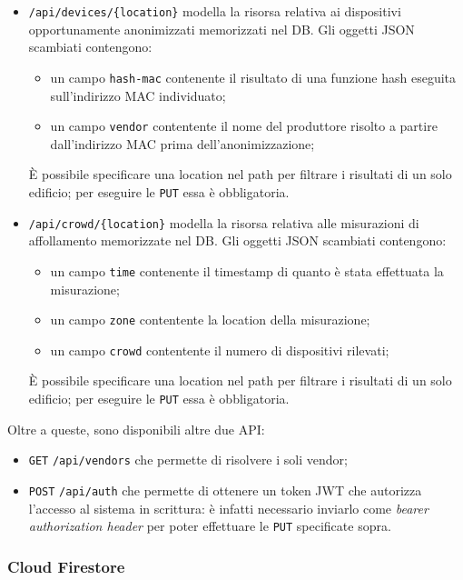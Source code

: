 \begin{itemize}
  \item
    \texttt{/api/devices/\{location\}} modella la risorsa relativa ai dispositivi opportunamente anonimizzati memorizzati nel DB\@.
    Gli oggetti JSON scambiati contengono:
    \begin{itemize}
      \item un campo \texttt{hash-mac} contenente il risultato di una funzione hash eseguita sull'indirizzo MAC individuato;
      \item un campo \texttt{vendor} contentente il nome del produttore risolto a partire dall'indirizzo MAC prima dell'anonimizzazione;
    \end{itemize}
    È possibile specificare una location nel path per filtrare i risultati di un solo edificio; per eseguire le \texttt{PUT} essa è obbligatoria.
  \item
    \texttt{/api/crowd/\{location\}} modella la risorsa relativa alle misurazioni di affollamento memorizzate nel DB\@.
    Gli oggetti JSON scambiati contengono:
    \begin{itemize}
      \item un campo \texttt{time} contenente il timestamp di quanto è stata effettuata la misurazione;
      \item un campo \texttt{zone} contentente la location della misurazione;
      \item un campo \texttt{crowd} contentente il numero di dispositivi rilevati;
    \end{itemize}
    È possibile specificare una location nel path per filtrare i risultati di un solo edificio; per eseguire le \texttt{PUT} essa è obbligatoria.
\end{itemize}

Oltre a queste, sono disponibili altre due API\@:

\begin{itemize}
  \item \texttt{GET} \texttt{/api/vendors} che permette di risolvere i soli vendor;
  \item
    \texttt{POST} \texttt{/api/auth} che permette di ottenere un token JWT che autorizza l'accesso al sistema in scrittura:
    è infatti necessario inviarlo come \emph{bearer authorization header} per poter effettuare le \texttt{PUT} specificate sopra.
\end{itemize}

\subsubsection{Cloud Firestore}

